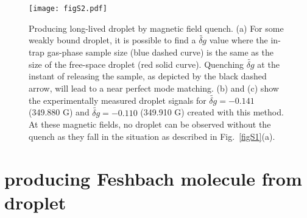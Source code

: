 \begin{figure}[hbtp]
\begin{center}
\texttt{[image: figS2.pdf]}
\end{center}
\caption[Producing long-lived droplet by magnetic field quench]{Producing long-lived droplet by magnetic field quench. (a) For some weakly bound droplet, it is possible to find a $\widetilde{\delta g}$ 
value where the in-trap gas-phase sample size (blue dashed curve) is the same as the size of the free-space droplet (red solid curve). Quenching $\widetilde{\delta g}$ at the instant of releasing the sample, as depicted by the black dashed arrow, will lead to a near perfect mode matching. (b) and (c) show the experimentally measured droplet signals for $\widetilde{\delta g} = -0.141$ (349.880 G) and $\widetilde{\delta g} = -0.110$ (349.910 G) created with this method. At these magnetic fields, no 
droplet can be observed without the quench as they fall in the situation as described in Fig.~\ref{figS1}(a).}
\label{figS2}
\end{figure}

\section{producing Feshbach molecule from droplet}
\label{sec:droplet_molecule}